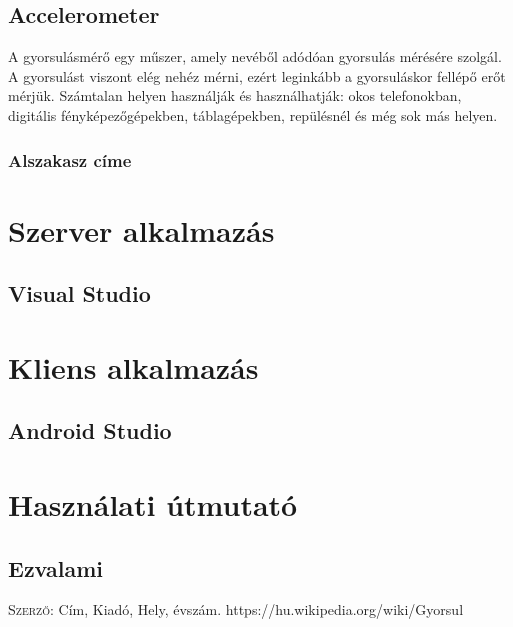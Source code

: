 \documentclass{thesis-ekf}
\theoremstyle{definition}
\theoremstyle{remark}
\begin{document}
\section{Accelerometer}
A gyorsulásmérő egy műszer, amely nevéből adódóan gyorsulás mérésére szolgál. A gyorsulást viszont elég nehéz mérni, ezért leginkább a gyorsuláskor fellépő erőt mérjük. Számtalan helyen használják és használhatják: okos telefonokban, digitális fényképezőgépekben, táblagépekben, repülésnél és még sok más helyen.

\subsection{Alszakasz címe}

\chapter{Szerver alkalmazás}
\section{Visual Studio}

\chapter{Kliens alkalmazás}
\section{Android Studio}

\chapter{Használati útmutató}
\section{Ezvalami}

\begin{thebibliography}{1}
 \textsc{Szerző}: Cím, Kiadó, Hely, évszám.
https://hu.wikipedia.org/wiki/Gyorsul%
\end{thebibliography}
\end{document}
